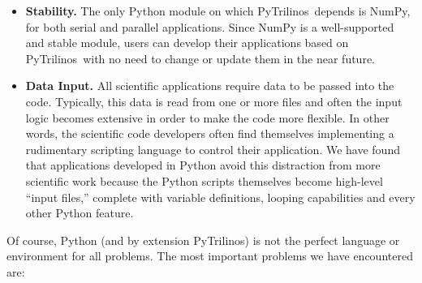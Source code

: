 \documentclass{llncs}
\newcommand{\PyTrilinos}{{\sc PyTrilinos}}
\begin{document}
\begin{itemize}
  Producing high quality software for state-of-the-art algorithms is a
  challenging goal.  Therefore, the production of high quality
  software requires a comprehensive set of testing programs.  A way to
  do that without influencing the rapid development of prototype code,
  is to write tests in Python.  By helping to detect defects,
  \PyTrilinos\ can become an important testing tool for Trilinos itself.
  (Clearly, \PyTrilinos\ tests require a bug-free interface between
  Trilinos and \PyTrilinos.) Using \PyTrilinos\ in the Trilinos test
  harness, one can experiment with the code to detect and manage
  dynamic errors, while static errors (like argument checking) must be
  detected by other types of testing.
%
\item {\bf Stability.} The only Python module on which
  \PyTrilinos\ depends is NumPy, for both serial and parallel
  applications.  Since NumPy is a well-supported and stable module,
  users can develop their applications based on \PyTrilinos\ with no
  need to change or update them in the near future.
%
\item {\bf Data Input.} All scientific applications require data to be
  passed into the code.  Typically, this data is read from one or more
  files and often the input logic becomes extensive in order to make
  the code more flexible.  In other words, the scientific code
  developers often find themselves implementing a rudimentary
  scripting language to control their application.  We have found that
  applications developed in Python avoid this distraction from more
  scientific work because the Python scripts themselves become
  high-level ``input files,'' complete with variable definitions,
  looping capabilities and every other Python feature.
\end{itemize}

\smallskip

Of course, Python (and by extension \PyTrilinos) is not the perfect
language or environment for all problems.  The most important problems
we have encountered are:
\end{document}
